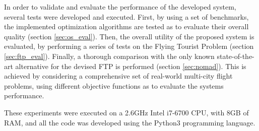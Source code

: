 In order to validate and evaluate the performance of the developed system, several tests were developed and executed. First, by using a set of benchmarks, the implemented optimization algorithms are tested as to evaluate their overall quality (section \ref{sec:os_eval}). Then, the overall utility of the proposed system is evaluated, by performing a series of tests on the Flying Tourist Problem (section \ref{sec:ftp_eval}). Finally, a thorough comparison with the only known state-of-the-art alternative for the devised FTP is performed (section \ref{sec:nomad}). This is achieved by considering a comprehensive set of real-world multi-city flight problems, using different objective functions as to evaluate the systems performance.

These experiments were executed on a 2.6GHz Intel i7-6700 CPU, with 8GB of RAM, and all the code was developed using the Python3 programming language. 

